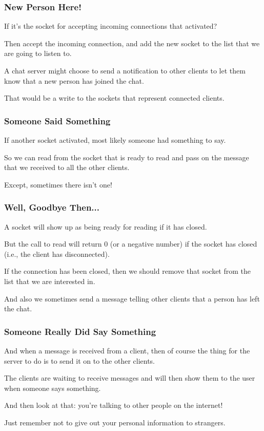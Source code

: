 \begin{frame}
	\frametitle{New Person Here!}

	If it's the socket for accepting incoming connections that activated?

	Then accept the incoming connection, and add the new socket to the list that we are going to listen to.

	A chat server might choose to send a notification to other clients to let them know that a new person has joined the chat.

	That would be a write to the sockets that represent connected clients.

\end{frame}

\begin{frame}
	\frametitle{Someone Said Something}

	If another socket activated, most likely someone had something to say.

	So we can read from the socket that is ready to read and pass on the message that we received to all the other clients.

	Except, sometimes there isn't one!

\end{frame}

\begin{frame}
	\frametitle{Well, Goodbye Then...}

	A socket will show up as being ready for reading if it has closed.

	But the call to read will return 0 (or a negative number) if the socket has closed (i.e., the client has disconnected).

	If the connection has been closed, then we should remove that socket from the list that we are interested in.

	And also we sometimes send a message telling other clients that a person has left the chat.

\end{frame}


\begin{frame}
	\frametitle{Someone Really Did Say Something}

	And when a message is received from a client, then of course the thing for the server to do is to send it on to the other clients.

	The clients are waiting to receive messages and will then show them to the user when someone says something.

	And then look at that: you're talking to other people on the internet!

	Just remember not to give out your personal information to strangers.

\end{frame}

